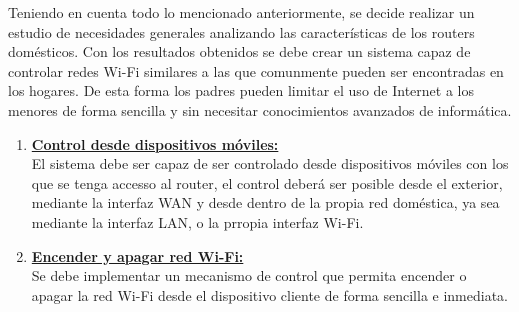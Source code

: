 \documentclass[12pt]{article}
\begin{document}
    Teniendo en cuenta todo lo mencionado anteriormente, se decide realizar un estudio de necesidades generales analizando las características de los routers domésticos. Con los resultados obtenidos se debe crear un sistema capaz de controlar redes Wi-Fi similares a las que comunmente pueden ser encontradas en los hogares. De esta forma  los padres pueden limitar el uso de Internet a los menores de forma sencilla y sin necesitar conocimientos avanzados de informática.
    \begin{enumerate}
        \item \textbf{\underline{Control desde dispositivos móviles:}} \\
            El sistema debe ser capaz de ser controlado desde dispositivos móviles con los que se tenga accesso al router, el control deberá ser posible desde el exterior, mediante la interfaz WAN y desde dentro de la propia red doméstica, ya sea mediante la interfaz LAN, o la prropia interfaz Wi-Fi.
        
        \item \textbf{\underline{Encender y apagar red Wi-Fi:}} \\
            Se debe implementar un mecanismo de control que permita encender o apagar la red Wi-Fi desde el dispositivo cliente de forma sencilla e inmediata.


\end{enumerate}
\end{document}

